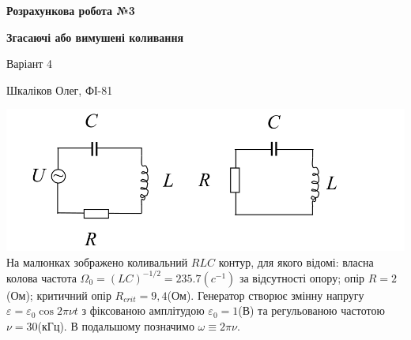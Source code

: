 \documentclass[a4paper, 12pt]{article}
\begin{document}
\begin{center}
    \textbf{Розрахункова робота №3}

    \textbf{Згасаючі або вимушені коливання}
\end{center}

\begin{flushright}
    Варіант 4

    Шкаліков Олег, ФІ-81
\end{flushright}

\includegraphics[width=1.0\textwidth]{graphics/RLC.png}
На малюнках зображено коливальний $RLC$ контур, для якого відомі:
власна колова частота $\Omega_0 = (LC)^{-1/2} = 235.7(c^{-1})$ за відсутності опору;
опір $R = 2$(Ом); критичний опір $R_{crit} = 9,4$(Ом). 
Генератор створює змінну напругу $\varepsilon  = \varepsilon_0 \cos{2\pi \nu t}$
з фіксованою амплітудою $\varepsilon_0 = 1$(В) та регульованою частотою $\nu = 30$(кГц). 
В подальшому позначимо $\omega \equiv 2 \pi \nu$.
\end{document}
